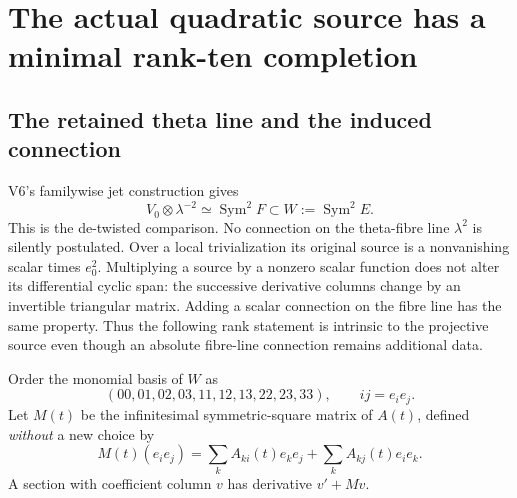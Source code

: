 \documentclass[11pt]{article}
\theoremstyle{definition}
\theoremstyle{remark}
\begin{document}
\section{The actual quadratic source has a minimal rank-ten completion}
\label{sec:v7-rank10}

\subsection{The retained theta line and the induced connection}
V6's familywise jet construction gives
\[
 V_0\otimes\lambda^{-2}\simeq\operatorname{Sym}^2F
       \subset W:=\operatorname{Sym}^2E.
\]
This is the de-twisted comparison. No connection on the theta-fibre line
$\lambda^2$ is silently postulated. Over a local trivialization its original
source is a nonvanishing scalar times $e_0^2$. Multiplying a source by a
nonzero scalar function does not alter its differential cyclic span: the
successive derivative columns change by an invertible triangular matrix.
Adding a scalar connection on the fibre line has the same property.
Thus the following rank statement is intrinsic to the projective source even
though an absolute fibre-line connection remains additional data.

Order the monomial basis of $W$ as
\begin{equation}
 (00,01,02,03,11,12,13,22,23,33),\qquad ij=e_i e_j.
 \label{eq:v7-W-basis}
\end{equation}
Let $M(t)$ be the infinitesimal symmetric-square matrix of $A(t)$, defined
\emph{without} a new choice by
\begin{equation}
 M(t)(e_i e_j)=\sum_k A_{ki}(t)e_ke_j+
                         \sum_k A_{kj}(t)e_ie_k.
 \label{eq:v7-M}
\end{equation}
A section with coefficient column $v$ has derivative $v'+Mv$.
\end{document}
